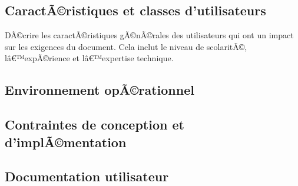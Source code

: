 \documentclass[a4paper, french, 10pt]{report}
\begin{document}
	
	\subsection{CaractÃ©ristiques et classes d'utilisateurs}
DÃ©crire les caractÃ©ristiques gÃ©nÃ©rales des utilisateurs qui ont un impact sur les exigences du document. Cela inclut le niveau de scolaritÃ©, lâ€™expÃ©rience et lâ€™expertise technique.

	\subsection{Environnement opÃ©rationnel}

	\subsection{Contraintes de conception et d'implÃ©mentation}

	\subsection{Documentation utilisateur}
\end{document}
